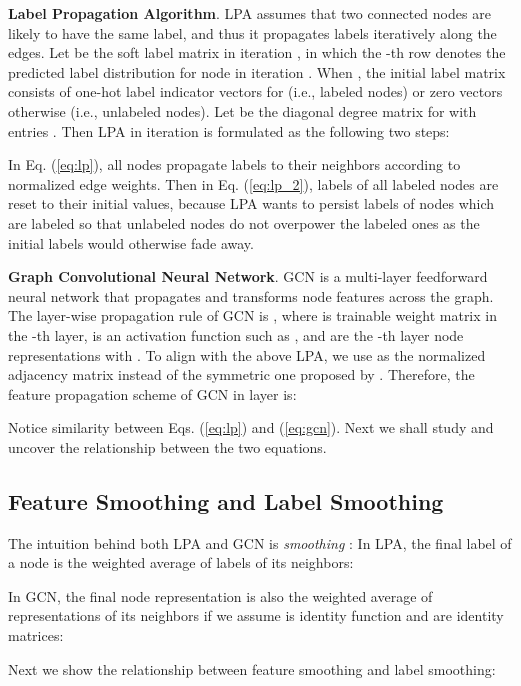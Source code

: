 \documentclass{article}
\begin{document}
		\textbf{Label Propagation Algorithm}.
		LPA assumes that two connected nodes are likely to have the same label, and thus it propagates labels iteratively along the edges.
		Let  be the soft label matrix in iteration , in which the -th row  denotes the predicted label distribution for node  in iteration .
		When , the initial label matrix  consists of one-hot label indicator vectors  for  (i.e., labeled nodes) or zero vectors otherwise (i.e., unlabeled nodes).
		Let  be the diagonal degree matrix for  with entries .
		Then LPA \citep{zhu2005semi} in iteration  is formulated as the following two steps:
		
		In Eq. (\ref{eq:lp}), all nodes propagate labels to their neighbors according to normalized edge weights.
		Then in Eq. (\ref{eq:lp_2}), labels of all labeled nodes are reset to their initial values, because LPA wants to persist labels of nodes which are labeled so that unlabeled nodes do not overpower the labeled ones as the initial labels would otherwise fade away.


		\textbf{Graph Convolutional Neural Network}.
		GCN is a multi-layer feedforward neural network that propagates and transforms node features across the graph.
		The layer-wise propagation rule of GCN is , where  is trainable weight matrix in the -th layer,  is an activation function such as , and  are the -th layer node representations with .
		To align with the above LPA, we use  as the normalized adjacency matrix instead of the symmetric one  proposed by \cite{kipf2017semi}.
		Therefore, the feature propagation scheme of GCN in layer  is:
		
Notice similarity between Eqs. (\ref{eq:lp}) and (\ref{eq:gcn}). Next we shall study and uncover the relationship between the two equations.
		
		
	\subsection{Feature Smoothing and Label Smoothing}
		The intuition behind both LPA and GCN is \textit{smoothing} \citep{zhu2003semi,li2018deeper}:
		In LPA, the final label of a node is the weighted average of labels of its neighbors:
		
		In GCN, the final node representation is also the weighted average of representations of its neighbors if we assume  is identity function and  are identity matrices:
		
Next we show the relationship between feature smoothing and label smoothing:
		
\end{document}
